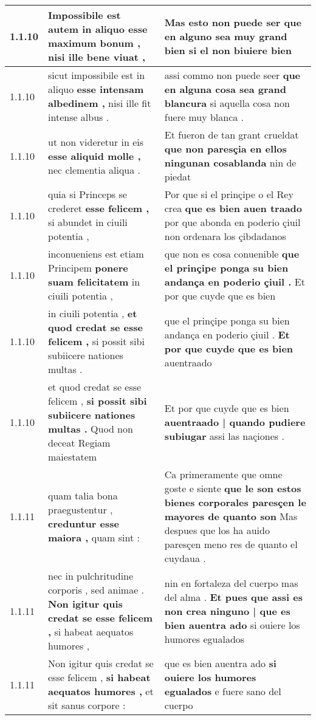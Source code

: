 \begin{tabular}{|p{1cm}|p{6.5cm}|p{6.5cm}|}
1.1.10 & Impossibile est autem \textbf{ in aliquo esse maximum bonum , } nisi ille bene viuat , & Mas esto non puede ser \textbf{ que en alguno sea muy grand bien } si el non biuiere bien \\\hline
1.1.10 & sicut impossibile est in aliquo \textbf{ esse intensam albedinem , } nisi ille fit intense albus . & assi commo non puede seer \textbf{ que en alguna cosa sea grand blancura } si aquella cosa non fuere muy blanca . \\\hline
1.1.10 & ut non videretur in eis \textbf{ esse aliquid molle , } nec clementia aliqua . & Et fueron de tan grant crueldat \textbf{ que non paresçia en ellos ningunan cosablanda } nin de piedat \\\hline
1.1.10 & quia si Princeps se crederet \textbf{ esse felicem , } si abundet in ciuili potentia , & Por que si el prinçipe o el Rey crea \textbf{ que es bien auen traado } por que abonda en poderio çiuil non ordenara los çibdadanos \\\hline
1.1.10 & inconueniens est etiam Principem \textbf{ ponere suam felicitatem } in ciuili potentia , & que non es cosa conuenible \textbf{ que el prinçipe ponga su bien andança en poderio çiuil . } Et por que cuyde que es bien \\\hline
1.1.10 & in ciuili potentia , \textbf{ et quod credat se esse felicem , } si possit sibi subiicere nationes multas . & que el prinçipe ponga su bien andança en poderio çiuil . \textbf{ Et por que cuyde que es bien } auentraado \\\hline
1.1.10 & et quod credat se esse felicem , \textbf{ si possit sibi subiicere nationes multas . } Quod non deceat Regiam maiestatem & Et por que cuyde que es bien \textbf{ auentraado | quando pudiere subiugar } assi las naçiones . \\\hline
1.1.11 & quam talia bona praegustentur , \textbf{ creduntur esse maiora , } quam sint : & Ca primeramente que omne goste e siente \textbf{ que le son estos bienes corporales paresçen le mayores de quanto son } Mas despues que los ha auido paresçen meno res de quanto el cuydaua . \\\hline
1.1.11 & nec in pulchritudine corporis , sed animae . \textbf{ Non igitur quis credat se esse felicem , } si habeat aequatos humores , & nin en fortaleza del cuerpo mas del alma . \textbf{ Et pues que assi es non crea ninguno | que es bien auentra ado } si ouiere los humores egualados \\\hline
1.1.11 & Non igitur quis credat se esse felicem , \textbf{ si habeat aequatos humores , } et sit sanus corpore : & que es bien auentra ado \textbf{ si ouiere los humores egualados } e fuere sano del cuerpo \\\hline

\end{tabular}
